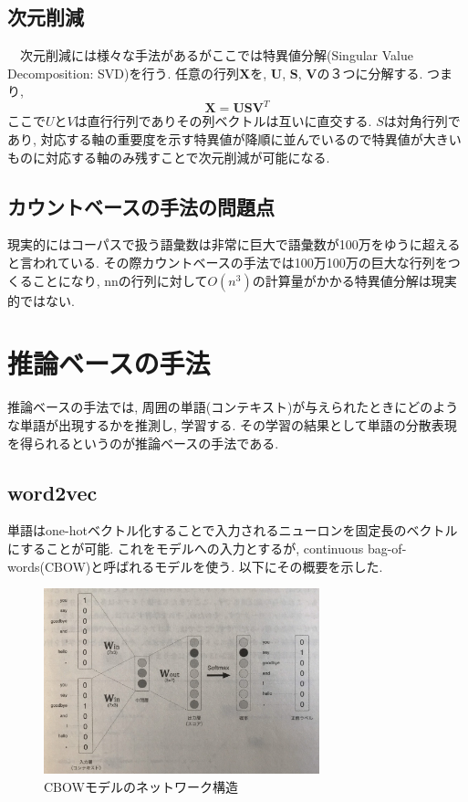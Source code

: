 \documentclass[twocolumn]{jarticle}
\begin{document}
\subsection{次元削減}
　次元削減には様々な手法があるがここでは特異値分解(Singular Value Decomposition: SVD)を行う. 任意の行列${\bm {X}}$を, ${\bm {U}}$, ${\bm {S}}$, ${\bm {V}}$の３つに分解する. つまり,
\begin{equation}
  \bm {X = USV}^T
\end{equation}
ここで${U}$と${V}$は直行行列でありその列ベクトルは互いに直交する. ${S}$は対角行列であり, 対応する軸の重要度を示す特異値が降順に並んでいるので特異値が大きいものに対応する軸のみ残すことで次元削減が可能になる.

\subsection{カウントベースの手法の問題点}
現実的にはコーパスで扱う語彙数は非常に巨大で語彙数が100万をゆうに超えると言われている. その際カウントベースの手法では100万\times 100万の巨大な行列をつくることになり, n\times nの行列に対して${O(n^3)}$の計算量がかかる特異値分解は現実的ではない.

\section{推論ベースの手法}
推論ベースの手法では, 周囲の単語(コンテキスト)が与えられたときにどのような単語が出現するかを推測し, 学習する. その学習の結果として単語の分散表現を得られるというのが推論ベースの手法である.

\subsection{word2vec}
単語はone-hotベクトル化することで入力されるニューロンを固定長のベクトルにすることが可能. これをモデルへの入力とするが, continuous bag-of-words(CBOW)と呼ばれるモデルを使う. 以下にその概要を示した.

\begin{figure}[!htbp]
 \begin{center}
   \includegraphics[width=8cm]{./CBOW.jpg}
   \caption{CBOWモデルのネットワーク構造}
   \label{fig:}
 \end{center}
\end{figure}
\end{document}
